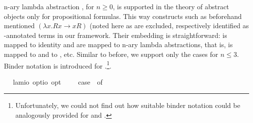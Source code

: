 \begin{isabellebody}
\begin{isamarkuptext}%
n-ary lambda abstraction , for $n\geq 0$, is supported in the theory of abstract 
  objects only for propositional formulas. This way constructs such as 
  beforehand mentioned $(\lambda x. Rx \rightarrow xR)$  (noted here as  
  are excluded, respectively identified as -annotated 
  terms in our framework.
  Their embedding is 
  straightforward:  is mapped to identity and  are mapped to n-ary
  lambda abstractions, that is,  is mapped to  and  
  to , etc.
  Similar to before, we support only the cases for $n\leq 3$. Binder notation is
  introduced for \isa{\isactrlbold {\isasymlambda}}.\footnote{Unfortunately, we could not find out how suitable binder notation
  could be analogously provided for  and .}.%
\end{isamarkuptext}%
\isamarkuptrue%
\ \isamarkupfalse%
\ lam{}{\isacharcolon}{\isacharcolon}{\isachardoublequoteopen}io\ opt{\isasymRightarrow}io\ opt{\isachardoublequoteclose}\ {\isacharparenleft}{\isachardoublequoteopen}\isactrlbold {\isasymlambda}\ \ {\isachardoublequoteopen}\isactrlbold {\isasymlambda}\ {\isasymequiv}\ case\ {\isasymphi}\ of\ \isanewline

\end{isabellebody}
